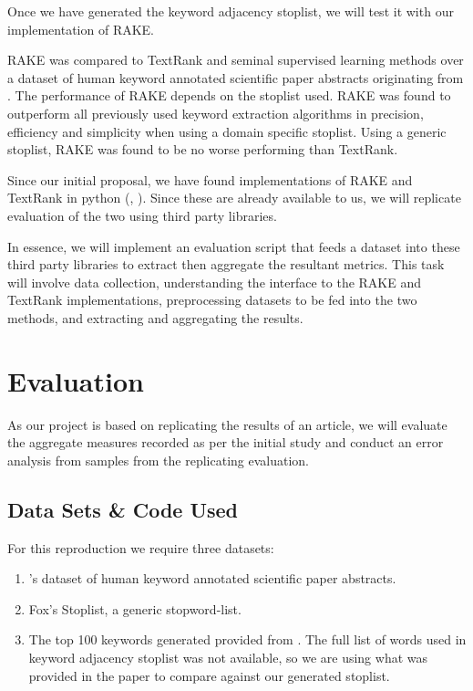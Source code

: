 \documentclass[11pt,a4paper]{article}
\begin{document}
Once we have generated the keyword adjacency stoplist, we will test it with our implementation of RAKE.

RAKE was compared to TextRank and seminal supervised learning methods \citep{hulth-2003-improved} over a dataset of human keyword annotated scientific paper abstracts originating from \citet{hulth-2003-improved}. The performance of RAKE depends on the stoplist used. RAKE was found to outperform all previously used keyword extraction algorithms in precision, efficiency and simplicity when using a domain specific stoplist. Using a generic stoplist, RAKE was found to be no worse performing than TextRank.

Since our initial proposal, we have found implementations of RAKE and TextRank in python (\citet{2}, \citet{3}). Since these are already available to us, we will replicate  evaluation of the two using third party libraries. 

In essence, we will implement an evaluation script that feeds a dataset into these third party libraries to extract then aggregate the resultant metrics. This task will involve data collection, understanding the interface to the RAKE and TextRank implementations, preprocessing datasets to be fed into the two methods, and extracting and aggregating the results.

\section{Evaluation}

As our project is based on replicating the results of an article, we will evaluate the aggregate measures recorded as per the initial study and conduct an error analysis from samples from the replicating evaluation. 



\subsection{Data Sets \& Code Used}
For this reproduction we require three datasets:

\begin{enumerate}
\item \citet{hulth-2003-improved}'s dataset of human keyword annotated scientific paper abstracts.
\item Fox's Stoplist, a generic stopword-list.
\item The top 100 keywords generated provided from . The full list of words used in  keyword adjacency stoplist was not available, so we are using what was provided in the paper to compare against our generated stoplist. 
\end{enumerate}  
\end{document}
